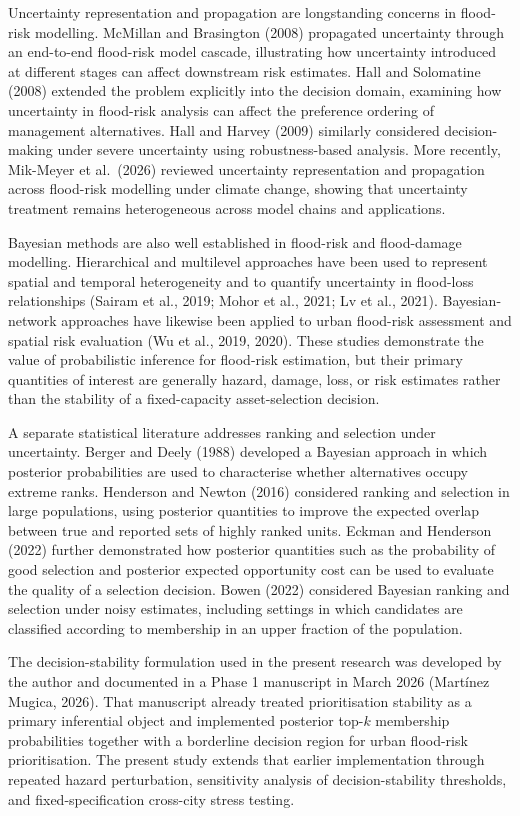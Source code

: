 \documentclass[
]{article}
\begin{document}
Uncertainty representation and propagation are longstanding concerns in
flood-risk modelling. McMillan and Brasington (2008) propagated
uncertainty through an end-to-end flood-risk model cascade, illustrating
how uncertainty introduced at different stages can affect downstream
risk estimates. Hall and Solomatine (2008) extended the problem
explicitly into the decision domain, examining how uncertainty in
flood-risk analysis can affect the preference ordering of management
alternatives. Hall and Harvey (2009) similarly considered
decision-making under severe uncertainty using robustness-based
analysis. More recently, Mik-Meyer et al.~(2026) reviewed uncertainty
representation and propagation across flood-risk modelling under climate
change, showing that uncertainty treatment remains heterogeneous across
model chains and applications.

Bayesian methods are also well established in flood-risk and
flood-damage modelling. Hierarchical and multilevel approaches have been
used to represent spatial and temporal heterogeneity and to quantify
uncertainty in flood-loss relationships (Sairam et al., 2019; Mohor et
al., 2021; Lv et al., 2021). Bayesian-network approaches have likewise
been applied to urban flood-risk assessment and spatial risk evaluation
(Wu et al., 2019, 2020). These studies demonstrate the value of
probabilistic inference for flood-risk estimation, but their primary
quantities of interest are generally hazard, damage, loss, or risk
estimates rather than the stability of a fixed-capacity asset-selection
decision.

A separate statistical literature addresses ranking and selection under
uncertainty. Berger and Deely (1988) developed a Bayesian approach in
which posterior probabilities are used to characterise whether
alternatives occupy extreme ranks. Henderson and Newton (2016)
considered ranking and selection in large populations, using posterior
quantities to improve the expected overlap between true and reported
sets of highly ranked units. Eckman and Henderson (2022) further
demonstrated how posterior quantities such as the probability of good
selection and posterior expected opportunity cost can be used to
evaluate the quality of a selection decision. Bowen (2022) considered
Bayesian ranking and selection under noisy estimates, including settings
in which candidates are classified according to membership in an upper
fraction of the population.

The decision-stability formulation used in the present research was
developed by the author and documented in a Phase 1 manuscript in March
2026 (Martínez Mugica, 2026). That manuscript already treated
prioritisation stability as a primary inferential object and implemented
posterior top-\(k\) membership probabilities together with a borderline
decision region for urban flood-risk prioritisation. The present study
extends that earlier implementation through repeated hazard
perturbation, sensitivity analysis of decision-stability thresholds, and
fixed-specification cross-city stress testing.
\end{document}
